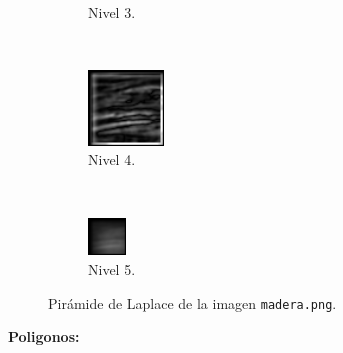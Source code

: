\documentclass[12pt, letterpaper]{article}
\begin{document}
\begin{figure}[H]
\begin{subfigure}[t]{0.32\textwidth}
      \caption{Nivel 3.}
  \end{subfigure}
  ~ 
  \begin{subfigure}[t]{0.32\textwidth}
      \centering
      \includegraphics[width = 0.22\textwidth]{madera/lp4.png}
      \caption{Nivel 4.}
  \end{subfigure}
  ~ 
  \begin{subfigure}[t]{0.32\textwidth}
      \centering
      \includegraphics[width = 0.11\textwidth]{madera/lp5.png}
      \caption{Nivel 5.}
  \end{subfigure}
  \caption{Pirámide de Laplace de la imagen \texttt{madera.png}.}
  \label{lpmadera}
\end{figure}

\par \textbf{Poligonos:}
\end{document}
